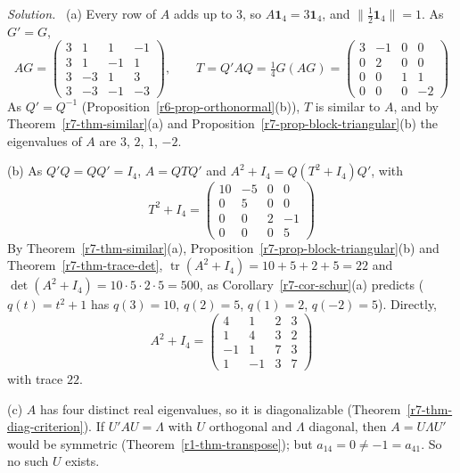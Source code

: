 \documentclass[12pt]{article}
\newcommand{\one}{\mathbf 1}
\DeclareMathOperator{\tr}{tr}
\theoremstyle{definition}
\newenvironment{solution}{\par\noindent\textit{Solution.}\ }{\par\smallskip}
\begin{document}
\begin{solution}
(a) Every row of \(A\) adds up to \(3\), so \(A\one_4=3\one_4\), and \(\lVert\frac12\one_4\rVert=1\). As \(G'=G\),
\[
AG=\begin{pmatrix}3&1&1&-1\\3&1&-1&1\\3&-3&1&3\\3&-3&-1&-3\end{pmatrix},\qquad
T=Q'AQ=\tfrac14G(AG)=\begin{pmatrix}3&-1&0&0\\0&2&0&0\\0&0&1&1\\0&0&0&-2\end{pmatrix}
\]
As \(Q'=Q^{-1}\) (Proposition~\ref{r6-prop-orthonormal}(b)), \(T\) is similar to \(A\), and by
Theorem~\ref{r7-thm-similar}(a) and Proposition~\ref{r7-prop-block-triangular}(b) the eigenvalues of \(A\) are \(3\),
\(2\), \(1\), \(-2\).

(b) As \(Q'Q=QQ'=I_4\), \(A=QTQ'\) and \(A^2+I_4=Q(T^2+I_4)Q'\), with
\[
T^2+I_4=\begin{pmatrix}10&-5&0&0\\0&5&0&0\\0&0&2&-1\\0&0&0&5\end{pmatrix}
\]
By Theorem~\ref{r7-thm-similar}(a), Proposition~\ref{r7-prop-block-triangular}(b) and Theorem~\ref{r7-thm-trace-det}, \(\tr(A^2+I_4)=10+5+2+5=22\) and
\(\det(A^2+I_4)=10\cdot5\cdot2\cdot5=500\), as Corollary~\ref{r7-cor-schur}(a) predicts (\(q(t)=t^2+1\) has
\(q(3)=10\), \(q(2)=5\), \(q(1)=2\), \(q(-2)=5\)). Directly,
\[
A^2+I_4=\begin{pmatrix}4&1&2&3\\1&4&3&2\\-1&1&7&3\\1&-1&3&7\end{pmatrix}
\]
with trace \(22\).

(c) \(A\) has four distinct real eigenvalues, so it is diagonalizable (Theorem~\ref{r7-thm-diag-criterion}). If
\(U'AU=\Lambda\) with \(U\) orthogonal and \(\Lambda\) diagonal, then \(A=U\Lambda U'\) would be symmetric
(Theorem~\ref{r1-thm-transpose}); but \(a_{14}=0\ne-1=a_{41}\). So no such \(U\) exists.
\end{solution}
\end{document}
